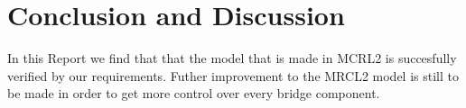 \section{Conclusion and Discussion}
In this Report we find that that the model that is made in MCRL2 is succesfully verified by our requirements. Futher improvement to the MRCL2 model is still to be made in order to get more control over every bridge component.